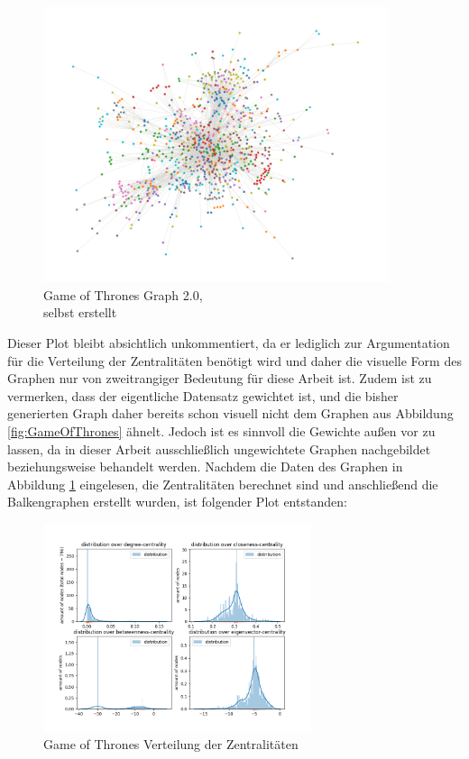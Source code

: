 \FloatBarrier
\begin{figure}[h!]%
  \centering
  \includegraphics[width=0.9\textwidth]{Graphics/GOTPlot.png}
  \caption{Game of Thrones Graph 2.0, \\
  selbst erstellt}
  \label{fig:GOT2.0}
\end{figure}
\FloatBarrier

Dieser Plot bleibt absichtlich unkommentiert, da er lediglich zur Argumentation für die Verteilung der Zentralitäten benötigt wird und daher die visuelle Form des Graphen nur von zweitrangiger Bedeutung für diese Arbeit ist. Zudem ist zu vermerken, dass der eigentliche Datensatz gewichtet ist, und die bisher generierten Graph daher bereits schon visuell nicht dem Graphen aus Abbildung \ref{fig:GameOfThrones} ähnelt. Jedoch ist es sinnvoll die Gewichte außen vor zu lassen, da in dieser Arbeit ausschließlich ungewichtete Graphen nachgebildet beziehungsweise behandelt werden. Nachdem die Daten des Graphen in Abbildung \ref{fig:GOT2.0} eingelesen, die Zentralitäten berechnet sind und anschließend die Balkengraphen erstellt wurden, ist folgender Plot entstanden:

\FloatBarrier
\begin{figure}[h!]%
  \centering
   \includegraphics[width=0.7\textwidth]{Graphics/GOT-Distribution.png}
  \caption{Game of Thrones Verteilung der Zentralitäten}
  \label{fig:distributionGOT}
\end{figure}
\FloatBarrier
 
